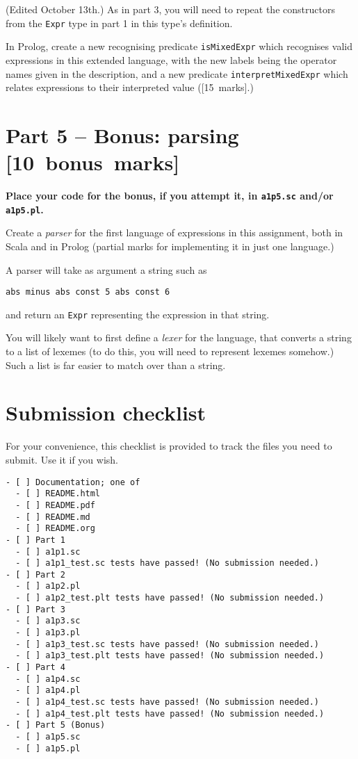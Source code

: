 \documentclass[11pt]{article}
\begin{document}
(Edited October 13th.)
As in part 3, you will need to repeat the constructors from the
\texttt{Expr} type in part 1 in this type's definition.

In Prolog, create a new recognising predicate \texttt{isMixedExpr} which
recognises valid expressions in this extended language,
with the new labels being the operator names given in the description,
and a new predicate \texttt{interpretMixedExpr} which relates
expressions to their interpreted value ([15 marks].)

\section*{Part 5 – Bonus: parsing                [10 bonus marks]}
\label{sec:orgb64f396}
\begin{center}
\textbf{Place your code for the bonus, if you attempt it, in \texttt{a1p5.sc} and/or \texttt{a1p5.pl}.}
\end{center}

Create a \emph{parser} for the first language of expressions
in this assignment, both in Scala and in Prolog
(partial marks for implementing it in just one language.)

A parser will take as argument a string such as
\begin{verbatim}
abs minus abs const 5 abs const 6
\end{verbatim}
and return an \texttt{Expr} representing the expression in that string.

You will likely want to first define a \emph{lexer} for the language,
that converts a string to a list of lexemes
(to do this, you will need to represent lexemes somehow.)
Such a list is far easier to match over than a string.

\section*{Submission checklist}
\label{sec:org7fff4b2}
For your convenience, this checklist is provided
to track the files you need to submit.
Use it if you wish.
\begin{verbatim}
- [ ] Documentation; one of
  - [ ] README.html
  - [ ] README.pdf
  - [ ] README.md
  - [ ] README.org
- [ ] Part 1
  - [ ] a1p1.sc
  - [ ] a1p1_test.sc tests have passed! (No submission needed.)
- [ ] Part 2
  - [ ] a1p2.pl
  - [ ] a1p2_test.plt tests have passed! (No submission needed.)
- [ ] Part 3
  - [ ] a1p3.sc
  - [ ] a1p3.pl
  - [ ] a1p3_test.sc tests have passed! (No submission needed.)
  - [ ] a1p3_test.plt tests have passed! (No submission needed.)
- [ ] Part 4
  - [ ] a1p4.sc
  - [ ] a1p4.pl
  - [ ] a1p4_test.sc tests have passed! (No submission needed.)
  - [ ] a1p4_test.plt tests have passed! (No submission needed.)
- [ ] Part 5 (Bonus)
  - [ ] a1p5.sc
  - [ ] a1p5.pl
\end{verbatim}
\end{document}
